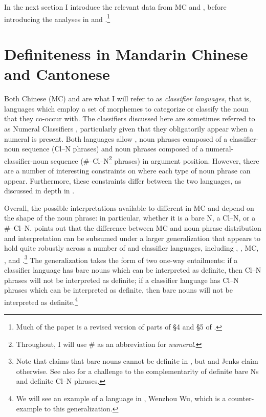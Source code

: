 \documentclass[output=paper
,modfonts
,nonflat]{langsci/langscibook}
\begin{document}
In the next section I introduce the relevant data from MC and , before introducing the analyses in \citet{ChengSybesma1999} and \citet{Simpson2005}.\footnote{Much of the paper is a revised version of parts of \S4 and \S5 of \citet{Hall2015}.}

\section{Definiteness in Mandarin Chinese and Cantonese} 

Both  Chinese (MC) and  are what I will refer to as \textit{classifier languages}, that is, languages which employ a set of morphemes to categorize or classify the noun that they co-occur with. The classifiers discussed here are sometimes referred to as Numeral Classifiers \citep{Aikhenvald2000}, particularly given that they obligatorily appear when a numeral is present. Both languages allow , noun phrases composed of a classifier-noun sequence (Cl--N phrases) and noun phrases composed of a numeral-classifier-noun sequence (\#--Cl--N\footnote{Throughout, I will use \# as an abbreviation for \textit{numeral}.} phrases) in argument position. However, there are a number of interesting constraints on where each type of noun phrase can appear. Furthermore, these constraints differ between the two languages, as discussed in depth in \citet{ChengSybesma1999}.


Overall, the possible interpretations available to different  in MC and  depend on the shape of the noun phrase: in particular, whether it is a bare N, a Cl--N, or a \#--Cl--N. \citet{Jenks2012} points out that the difference between MC and  noun phrase distribution and interpretation can be subsumed under a larger generalization that appears to hold quite robustly across a number of  and  classifier languages, including , , MC, , and .\footnote{Note that \citet{Trinh2011} claims that bare nouns cannot be definite in , but \citet{Nguyen2004} and Jenks claim otherwise. See also \citet{SimpsonEtAlii2011} for a challenge to the complementarity of definite bare Ns and definite Cl--N phrases.} The generalization takes the form of two one-way entailments: if a classifier language has bare nouns which can be interpreted as definite, then Cl--N phrases will not be interpreted as definite; if a classifier language has Cl--N phrases which can be interpreted as definite, then bare nouns will not be interpreted as definite.\footnote{We will see an example of a language in , Wenzhou Wu, which is a counter-example to this generalization.} 
\end{document}
